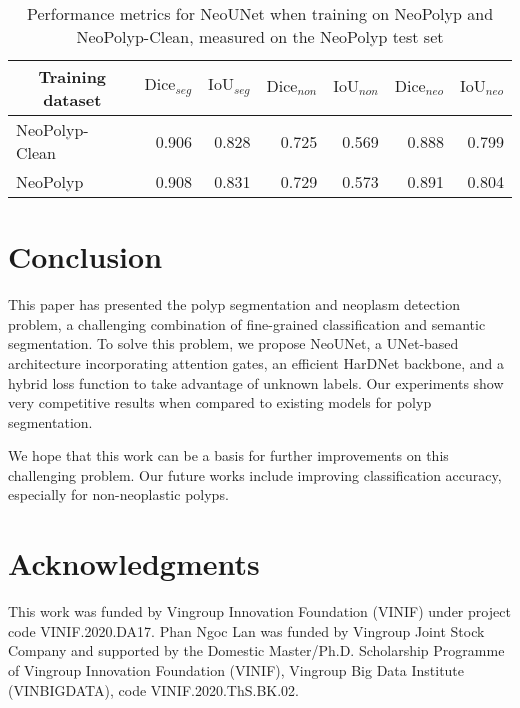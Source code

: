 \documentclass[runningheads]{llncs}
\newcommand{\ModelName}{NeoUNet\xspace}
\newcommand{\DatasetName}{NeoPolyp\xspace}
\newcommand{\CleanDatasetName}{NeoPolyp-Clean\xspace}
\begin{document}
	\begin{table}[tbh]
		\centering
		\caption{Performance metrics for \ModelName when training on \DatasetName and \CleanDatasetName, measured on the \DatasetName test set}
		\label{tab:exp2}
		\begin{tabular}{@{} l r r r r r r@{}}
			\toprule
			\multicolumn{1}{c}{Training dataset} & \multicolumn{1}{c}{$\text{Dice}_{seg}$} & \multicolumn{1}{c}{$\text{IoU}_{seg}$} & \multicolumn{1}{c}{$\text{Dice}_{non}$} & \multicolumn{1}{c}{$\text{IoU}_{non}$} & \multicolumn{1}{c}{$\text{Dice}_{neo}$} & \multicolumn{1}{c}{$\text{IoU}_{neo}$} \\ \midrule
			\CleanDatasetName & 0.906 & 0.828 & 0.725 & 0.569 & 0.888 & 0.799 \\
			\DatasetName & 0.908 & 0.831 & 0.729 & 0.573 & 0.891 & 0.804 \\
			\bottomrule
		\end{tabular}

	\end{table}

	\section{Conclusion}
	\label{sec:conclude}
	This paper has presented the polyp segmentation and neoplasm detection problem, a challenging combination of fine-grained classification and semantic segmentation. To solve this problem, we propose \ModelName, a UNet-based architecture incorporating attention gates, an efficient HarDNet backbone, and a hybrid loss function to take advantage of unknown labels. Our experiments show very competitive results when compared to existing models for polyp segmentation.

	We hope that this work can be a basis for further improvements on this challenging problem. Our future works include improving classification accuracy, especially for non-neoplastic polyps.

	 \section{Acknowledgments}
	 This work was funded by Vingroup Innovation Foundation (VINIF) under project code VINIF.2020.DA17. Phan Ngoc Lan was funded by Vingroup Joint Stock Company and supported by the Domestic Master/Ph.D. Scholarship Programme of Vingroup Innovation Foundation (VINIF), Vingroup Big Data Institute (VINBIGDATA), code VINIF.2020.ThS.BK.02.

	
	
\end{document}
